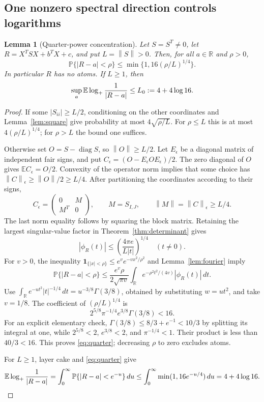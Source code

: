 \documentclass[11pt]{article}
\numberwithin{equation}{section}
\newtheorem{lemma}[theorem]{Lemma}
\theoremstyle{definition}\newtheorem{definition}[theorem]{Definition}
\theoremstyle{remark}\newtheorem{remark}[theorem]{Remark}
\newcommand{\R}{\mathbb R}\newcommand{\E}{\mathbb E}\newcommand{\PP}{\mathbb P}
\newcommand{\1}{\mathbf 1}\newcommand{\diag}{\operatorname{diag}}
\newcommand{\norm}[1]{\left\lVert#1\right\rVert}\newcommand{\abs}[1]{\left|#1\right|}
\begin{document}
\subsection{One nonzero spectral direction controls logarithms}
\begin{lemma}[Quarter-power concentration]\label{lem:quarter}
Let $S=S^T\ne0$, let $R=X^TSX+b^TX+c$, and put $L=\norm S>0$. Then, for all $a\in\R$ and $\rho>0$,
\begin{equation}\label{eq:quarter}
 \PP\{|R-a|<\rho\}\le\min\{1,16(\rho/L)^{1/4}\}.
\end{equation}
In particular $R$ has no atoms. If $L\ge1$, then
\begin{equation}\label{eq:log-bound}
 \sup_a\E\logp\frac1{|R-a|}\le L_0:=4+4\log16.
\end{equation}
\end{lemma}
\begin{proof}
If some $|S_{ii}|\ge L/2$, conditioning on the other coordinates and Lemma~\ref{lem:square} give probability at most $4\sqrt{\rho/L}$. For $\rho\le L$ this is at most $4(\rho/L)^{1/4}$; for $\rho>L$ the bound one suffices.

Otherwise set $O=S-\diag S$, so $\norm O\ge L/2$. Let $E_\epsilon$ be a diagonal matrix of independent fair signs, and put $C_\epsilon=(O-E_\epsilon O E_\epsilon)/2$. The zero diagonal of $O$ gives $\E C_\epsilon=O/2$. Convexity of the operator norm implies that some choice has $\norm C_\epsilon\ge\norm O/2\ge L/4$. After partitioning the coordinates according to their signs,
\[
 C_\epsilon=\begin{pmatrix}0&M\\M^T&0\end{pmatrix},\qquad
 M=S_{I,J},\qquad \norm M=\norm C_\epsilon\ge L/4.
\]
The last norm equality follows by squaring the block matrix. Retaining the largest singular-value factor in Theorem~\ref{thm:determinant} gives
\[
 |\phi_R(t)|\le\left(\frac{4\pi e}{L|t|}\right)^{1/4}\quad(t\ne0).
\]
For $v>0$, the inequality $\1_{\{|x|<\rho\}}\le e^v e^{-vx^2/\rho^2}$ and Lemma~\ref{lem:fourier} imply
\[
 \PP\{|R-a|<\rho\}\le\frac{e^v\rho}{2\sqrt{\pi v}}
 \int_\R e^{-\rho^2t^2/(4v)}|\phi_R(t)|\,dt.
\]
Use $\int_\R e^{-ut^2}|t|^{-1/4}\,dt=u^{-3/8}\Gamma(3/8)$, obtained by substituting $w=ut^2$, and take $v=1/8$. The coefficient of $(\rho/L)^{1/4}$ is
\[
 2^{5/8}\pi^{-1/4}e^{3/8}\Gamma(3/8)<16.
\]
For an explicit elementary check, $\Gamma(3/8)\le8/3+e^{-1}<10/3$ by splitting its integral at one, while $2^{5/8}<2$, $e^{3/8}<2$, and $\pi^{-1/4}<1$. Their product is less than $40/3<16$. This proves \eqref{eq:quarter}; decreasing $\rho$ to zero excludes atoms.

For $L\ge1$, layer cake and \eqref{eq:quarter} give
\[
 \E\logp\frac1{|R-a|}
 =\int_0^\infty\PP\{|R-a|<e^{-u}\}\,du
 \le\int_0^\infty\min(1,16e^{-u/4})\,du
 =4+4\log16.
\]
\end{proof}
\end{document}
